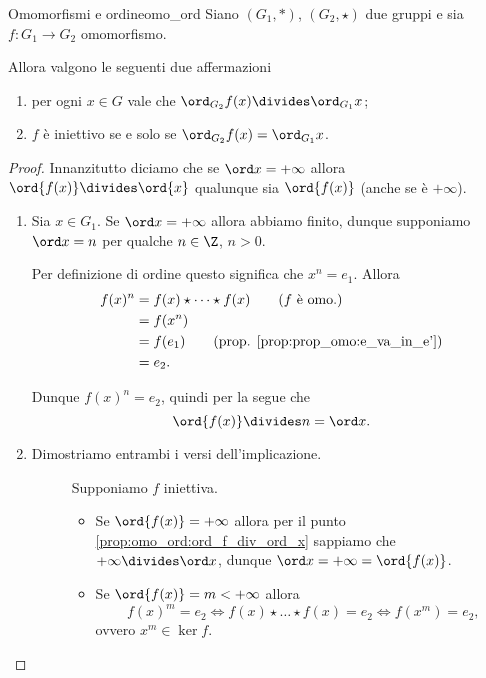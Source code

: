 \begin{proposition}
    {Omomorfismi e ordine}{omo_ord}
    Siano $(G_1, *)$, $(G_2, \star)$ due gruppi e sia $f : G_1 \to G_2$ omomorfismo.

    Allora valgono le seguenti due affermazioni \begin{enumerate}[label={(\roman*)}]
        \item \label{prop:omo_ord:ord_f_div_ord_x} per ogni $x \in G$ vale che $\ord_{G_2}{f(x)} \divides \ord_{G_1}{x}$;
        \item \label{prop:omo_ord:inj_sse_ord_f=ord_x} $f$ è iniettivo se e solo se $\ord_{G_2}{f(x)} = \ord_{G_1}{x}$.
    \end{enumerate}
\end{proposition}
\begin{proof}
    Innanzitutto diciamo che se $\ord x = +\infty$ allora $\ord{f(x)} \divides \ord{x}$ qualunque sia $\ord{f(x)}$ (anche se è $+\infty$).

    \begin{enumerate}[label={(\roman*)}]
        \item Sia $x \in G_1$. Se $\ord x = +\infty$ allora abbiamo finito, dunque supponiamo $\ord x = n$ per qualche $n \in \Z$, $n > 0$.
        
        Per definizione di ordine questo significa che $x^n = e_1$.
        Allora \begin{align*}
            f(x)^n &= f(x) \star \cdots \star f(x) \tag{$f$ è omo.}\\
            &= f(x^n) \\
            &= f(e_1) \tag{prop. \ref{prop:prop_omo:e_va_in_e'}}\\
            &= e_2.
        \end{align*}

        Dunque $f(x)^n = e_2$, quindi per la  segue che \[
            \ord{f(x)} \divides n = \ord x.    
        \]
        \item Dimostriamo entrambi i versi dell'implicazione.
        \begin{description}
            \item[\boximpl ] Supponiamo $f$ iniettiva. \begin{itemize}
                \item Se $\ord{f(x)} = +\infty$ allora per il punto \ref{prop:omo_ord:ord_f_div_ord_x} sappiamo che $+\infty \divides \ord x$, dunque $\ord x = +\infty = \ord{f(x)}$.
                \item Se $\ord{f(x)} = m < +\infty$ allora \[
                    f(x)^m = e_2 \iff f(x) \star \dots \star f(x) = e_2 \iff f(x^m) = e_2,    
                \] ovvero $x^m \in \ker f$.


\end{itemize}
\end{description}
\end{enumerate}
\end{proof}
